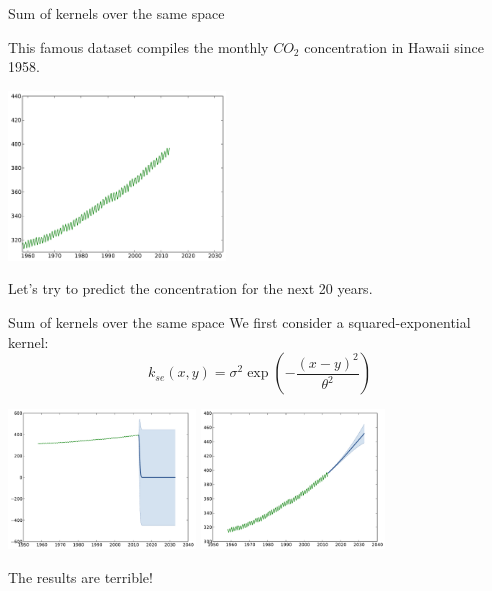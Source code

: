 \documentclass{beamer}
\begin{document}
\begin{frame}{Sum of kernels over the same space }
\begin{example}
This famous dataset compiles the monthly $CO_2$ concentration in Hawaii since 1958.
\begin{center}
\includegraphics[height=4.5cm]{figures/python/CO2-data}
\end{center}
Let's try to predict the concentration for the next 20 years.
\end{example}
\end{frame}

\begin{frame}{Sum of kernels over the same space }
We first consider a squared-exponential kernel:
$$ \displaystyle k_{se}(x,y) = \sigma^2\exp \left(-\frac{(x-y)^2}{\theta^2} \right)$$
\begin{center}
\includegraphics[height=3.7cm]{figures/python/CO2-rbfa} \quad \includegraphics[height=3.7cm]{figures/python/CO2-rbfb}
\end{center}
\begin{block}{}
\centering
\alert{The results are terrible!}
\end{block}
\end{frame}
\end{document}
